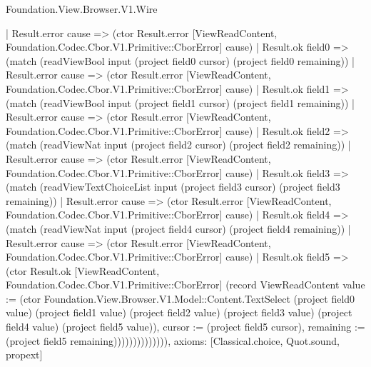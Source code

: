 \begin{lexlean}{Foundation.View.Browser.V1.Wire}
\begin{semanticmodule}
{              | Result.error cause => (ctor Result.error [ViewReadContent, Foundation.Codec.Cbor.V1.Primitive::CborError] cause)
              | Result.ok field0 => (match (readViewBool input (project field0 cursor) (project field0 remaining))
                | Result.error cause => (ctor Result.error [ViewReadContent, Foundation.Codec.Cbor.V1.Primitive::CborError] cause)
                | Result.ok field1 => (match (readViewBool input (project field1 cursor) (project field1 remaining))
                  | Result.error cause => (ctor Result.error [ViewReadContent, Foundation.Codec.Cbor.V1.Primitive::CborError] cause)
                  | Result.ok field2 => (match (readViewNat input (project field2 cursor) (project field2 remaining))
                    | Result.error cause => (ctor Result.error [ViewReadContent, Foundation.Codec.Cbor.V1.Primitive::CborError] cause)
                    | Result.ok field3 => (match (readViewTextChoiceList input (project field3 cursor) (project field3 remaining))
                      | Result.error cause => (ctor Result.error [ViewReadContent, Foundation.Codec.Cbor.V1.Primitive::CborError] cause)
                      | Result.ok field4 => (match (readViewNat input (project field4 cursor) (project field4 remaining))
                        | Result.error cause => (ctor Result.error [ViewReadContent, Foundation.Codec.Cbor.V1.Primitive::CborError] cause)
                        | Result.ok field5 => (ctor Result.ok [ViewReadContent, Foundation.Codec.Cbor.V1.Primitive::CborError] (record ViewReadContent {value := (ctor Foundation.View.Browser.V1.Model::Content.TextSelect (project field0 value) (project field1 value) (project field2 value) (project field3 value) (project field4 value) (project field5 value)), cursor := (project field5 cursor), remaining := (project field5 remaining)}))))))))))))),
  axioms: [Classical.choice, Quot.sound, propext]
}


\end{semanticmodule}
\end{lexlean}
